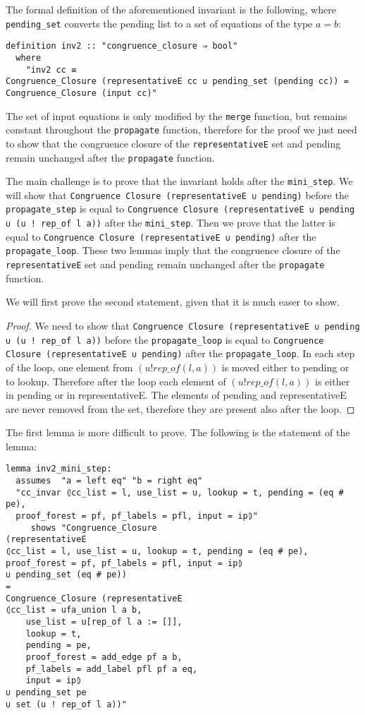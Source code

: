 The formal definition of the aforementioned invariant is the following, where \lstinline{pending_set} converts the pending list to a set of equations of the type $a = b$:

\begin{lstlisting}
definition inv2 :: "congruence_closure ⇒ bool"
  where
    "inv2 cc ≡
Congruence_Closure (representativeE cc ∪ pending_set (pending cc)) = Congruence_Closure (input cc)"
\end{lstlisting}

The set of input equations is only modified by the \lstinline{merge} function, but remains constant throughout the \lstinline{propagate} function, therefore for the proof we just need to show that the congruence closure of the \lstinline{representativeE} set and pending remain unchanged after the \lstinline{propagate} function.

The main challenge is to prove that the invariant holds after the \lstinline{mini_step}. We will show that \lstinline{Congruence Closure (representativeE ∪ pending)} before the \lstinline{propagate_step} is equal to \lstinline{Congruence Closure (representativeE ∪ pending ∪ (u ! rep_of l a))} after the \lstinline{mini_step}.
Then we prove that the latter is equal to \lstinline{Congruence Closure (representativeE ∪ pending)}  after the \lstinline{propagate_loop}.
These two lemmas imply that the congruence closure of the \lstinline{representativeE} set and pending remain unchanged after the \lstinline{propagate} function.

We will first prove the second statement, given that it is much easer to show.

\begin{proof}
We need to show that \lstinline{Congruence Closure (representativeE ∪ pending ∪ (u ! rep_of l a))} before the \lstinline{propagate_loop} is equal to \lstinline{Congruence Closure (representativeE ∪ pending)}  after the \lstinline{propagate_loop}. In each step of the loop, one element from $(u ! rep\_of(l, a))$ is moved either to pending or to lookup. Therefore after the loop each element of $(u ! rep\_of(l, a))$ is either in pending or in representativeE. The elements of pending and representativeE are never removed from the set, therefore they are present also after the loop.
\end{proof}

The first lemma is more difficult to prove. The following is the statement of the lemma:

\begin{lstlisting}[label=lst:inv2_mini_step]
lemma inv2_mini_step:
  assumes  "a = left eq" "b = right eq"
  "cc_invar ⦇cc_list = l, use_list = u, lookup = t, pending = (eq # pe),
  proof_forest = pf, pf_labels = pfl, input = ip⦈"
     shows "Congruence_Closure
(representativeE
⦇cc_list = l, use_list = u, lookup = t, pending = (eq # pe),
proof_forest = pf, pf_labels = pfl, input = ip⦈
∪ pending_set (eq # pe))
=
Congruence_Closure (representativeE
⦇cc_list = ufa_union l a b,
    use_list = u[rep_of l a := []],
    lookup = t,
    pending = pe,
    proof_forest = add_edge pf a b,
    pf_labels = add_label pfl pf a eq,
    input = ip⦈
∪ pending_set pe
∪ set (u ! rep_of l a))"
\end{lstlisting}

